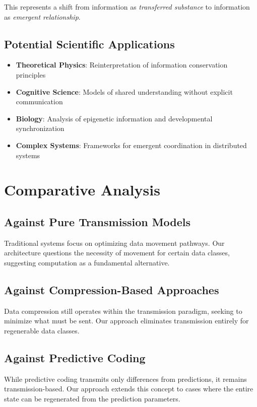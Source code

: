 \documentclass[11pt,a4paper]{article}
\begin{document}
This represents a shift from information as \emph{transferred substance} to information as \emph{emergent relationship}.

\subsection{Potential Scientific Applications}

\begin{itemize}
    \item \textbf{Theoretical Physics}: Reinterpretation of information conservation principles
    \item \textbf{Cognitive Science}: Models of shared understanding without explicit communication
    \item \textbf{Biology}: Analysis of epigenetic information and developmental synchronization
    \item \textbf{Complex Systems}: Frameworks for emergent coordination in distributed systems
\end{itemize}

\section{Comparative Analysis}

\subsection{Against Pure Transmission Models}

Traditional systems focus on optimizing data movement pathways. Our architecture questions the necessity of movement for certain data classes, suggesting computation as a fundamental alternative.

\subsection{Against Compression-Based Approaches}

Data compression still operates within the transmission paradigm, seeking to minimize what must be sent. Our approach eliminates transmission entirely for regenerable data classes.

\subsection{Against Predictive Coding}

While predictive coding transmits only differences from predictions, it remains transmission-based. Our approach extends this concept to cases where the entire state can be regenerated from the prediction parameters.
\end{document}
